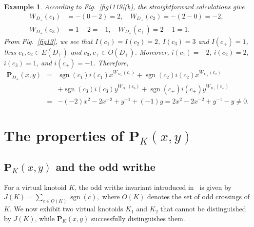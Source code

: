 \documentclass[10pt,a4paper]{amsart}
\newtheorem{example}{Example}[section]
\numberwithin{equation}{section}
\numberwithin{equation}{section}
\begin{document}
\begin{example}
{		According to Fig.~\ref{fig1119}(b), the straightforward calculations give
		$$
		\begin{aligned}
			W_{D_+}(c_1) &= -(0-2) = 2, \quad W_{D_+}(c_2) =-(2-0)= -2, \\ W_{D_+}(c_3) &=1-2= -1, \quad W_{D_+}(c_+) =2-1= 1.
		\end{aligned}
		$$ 
		From Fig.~\ref{fig13}, we see that $I(c_1)=I(c_2)=2$, $I(c_3)=3$ and $I(c_+)=1$, thus $c_1, c_2 \in E(D_+)$ and $c_3, c_+ \in O(D_+)$. Moreover, $i(c_1)=-2$, $i(c_2)=2$, $i(c_3)=1$, and $i(c_+)=-1$. Therefore, 
		\begin{eqnarray*}
			\mathbf{P}_{D_+}(x,y)&=&\operatorname{sgn}(c_1) i(c_1) x^{W_{D_+}(c_1)}+\operatorname{sgn}(c_2) i(c_2) x^{W_{D_+}(c_2)}\\
			&&+\operatorname{sgn}(c_3) i(c_3) y^{W_{D_+}(c_3)}+\operatorname{sgn}(c_+) i(c_+) y^{W_{D_+}(c_+)}\\
			&=& -(-2) x^{2}-2 x^{-2} + y^{-1} +(-1) y= 2x^2-2x^{-2}+y^{-1}-y \neq 0.
	\end{eqnarray*} }
\end{example} 

\section{The properties of $\mathbf{P}_K(x,y)$} \label{section3}


\subsection{$\mathbf{P}_K(x,y)$ and the odd writhe} \label{subsection3.0}

For a virtual knotoid $K$, the odd writhe invariant introduced in~\cite{GK} is given by
$
J(K)=\sum_{c\in O(K)}\operatorname{sgn}(c),
$
where $O(K)$ denotes the set of odd crossings of $K$. We now exhibit two virtual knotoids $K_1$ and $K_2$ that cannot be distinguished by $J(K)$, while $\mathbf{P}_K(x,y)$ successfully distinguishes them.
\end{document}
